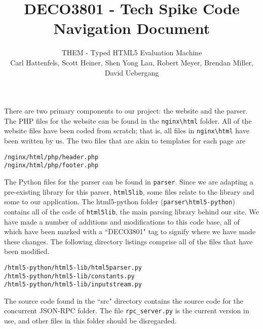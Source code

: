 \documentclass[10pt]{article}
\title{\bf \large DECO3801 - Tech Spike Code Navigation Document}
\author{\normalsize THEM - Typed HTML5 Evaluation Machine \\ \normalsize Carl Hattenfels, Scott Heiner, Shen Yong Lau, Robert Meyer, Brendan Miller, David Uebergang}
\date{}
\begin{document}
\maketitle

There are two primary components to our project: the website and the parser. The PHP files for the website can be found in the \verb'nginx\html' folder. All of the website files have been coded from scratch; that is, all files in \verb'nginx\html' have been written by us. The two files that are akin to templates for each page are 

\begin{verbatim}
/nginx/html/php/header.php
/nginx/html/php/footer.php
\end{verbatim}

The Python files for the parser can be found in \verb'parser'. Since we are adapting a pre-existing library for this parser, \verb'html5lib', some files relate to the library and some to our application. The html5-python folder (\verb'parser\html5-python') contains all of the code of \verb'html5lib', the main parsing library behind our site. We have made a number of additions and modifications to this code base, all of which have been marked with a ``DECO3801" tag to signify where we have made these changes. The following directory listings comprise all of the files that have been modified.

\begin{verbatim}/html5-python/html5-lib/html5parser.py
/html5-python/html5-lib/constants.py
/html5-python/html5-lib/inputstream.py
\end{verbatim}

The source code found in the ``src" directory contains the source code for the concurrent JSON-RPC folder. The file \verb'rpc_server.py' is the current version in use, and other files in this folder should be disregarded.
\end{document}
